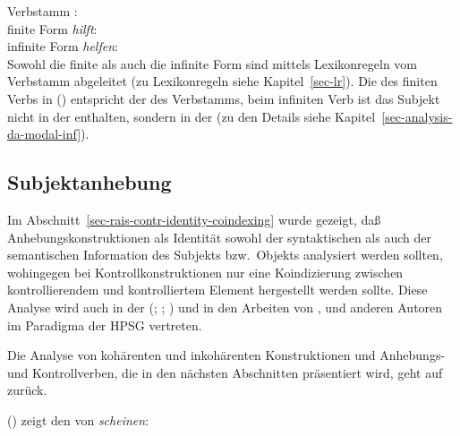 {
\ea
Verbstamm :\\
\z 
\ea
finite Form \emph{hilft}:\\
\z 
\ea
infinite Form \emph{helfen}:\\
\z
Sowohl die finite als auch die infinite Form sind mittels Lexikonregeln vom Verbstamm abgeleitet
(zu Lexikonregeln siehe Kapitel~\ref{sec-lr}). Die \compsl des finiten Verbs in () entspricht der \compsl
des Verbstamms, beim infiniten Verb ist das Subjekt nicht in der \compsl enthalten, sondern in der
\subjl (zu den Details siehe Kapitel~\ref{sec-analysis-da-modal-inf}).


\subsection{Subjektanhebung}
\label{sec-subjektanhebung-anal}

Im Abschnitt~\ref{sec-rais-contr-identity-coindexing} wurde gezeigt,
daß Anhebungskonstruktionen als Identität sowohl der syntaktischen
als auch der semantischen Information des Subjekts bzw.\ Objekts analysiert werden
sollten, wohingegen bei Kontrollkonstruktionen nur eine Koindizierung
zwischen kontrollierendem und kontrolliertem Element hergestellt werden sollte.
Diese Analyse wird auch in der \lfg
(\citealp{Andrews82b}; \citealp{Neidle82a}; \citealp[]{Bresnan82c})
und in den Arbeiten von \citet[Kapitel~7]{ps2}, \citet{Kiss95a}
und anderen Autoren im Paradigma der HPSG vertreten.

Die Analyse von kohärenten und inkohärenten Konstruktionen und Anhebungs- und
Kontrollverben, die in den nächsten Abschnitten präsentiert wird,
geht auf \citet{Kiss95a} zurück. 

() zeigt den \locw von \emph{scheinen}:

}
